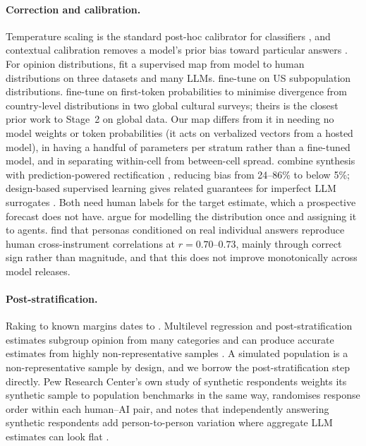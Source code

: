 \documentclass[11pt]{article}
\begin{document}
\paragraph{Correction and calibration.}
Temperature scaling is the standard post-hoc calibrator for classifiers \citep{guo2017calibration}, and contextual calibration removes a model's prior bias toward particular answers \citep{zhao2021calibrate}. For opinion distributions, \citet{kambhatla2025supervision} fit a supervised map from model to human distributions on three datasets and many LLMs. \citet{suh2025subpop} fine-tune on US subpopulation distributions. \citet{cao2025specializing} fine-tune on first-token probabilities to minimise divergence from country-level distributions in two global cultural surveys; theirs is the closest prior work to Stage~2 on global data. Our map differs from it in needing no model weights or token probabilities (it acts on verbalized vectors from a hosted model), in having a handful of parameters per stratum rather than a fine-tuned model, and in separating within-cell from between-cell spread. \citet{krsteski2025valid} combine synthesis with prediction-powered rectification \citep{angelopoulos2023ppi}, reducing bias from 24--86\% to below 5\%; design-based supervised learning gives related guarantees for imperfect LLM surrogates \citep{egami2023dsl}. Both need human labels for the target estimate, which a prospective forecast does not have. \citet{ozkan2026distribution} argue for modelling the distribution once and assigning it to agents. \citet{lee2026openweight} find that personas conditioned on real individual answers reproduce human cross-instrument correlations at $r=0.70$--$0.73$, mainly through correct sign rather than magnitude, and that this does not improve monotonically across model releases.

\paragraph{Post-stratification.}
Raking to known margins dates to \citet{deming1940ipf}. Multilevel regression and post-stratification estimates subgroup opinion from many categories \citep{gelman1997poststrat,park2004mrp} and can produce accurate estimates from highly non-representative samples \citep{wang2015xbox}. A simulated population is a non-representative sample by design, and we borrow the post-stratification step directly. Pew Research Center's own study of synthetic respondents weights its synthetic sample to population benchmarks in the same way, randomises response order within each human--AI pair, and notes that independently answering synthetic respondents add person-to-person variation where aggregate LLM estimates can look flat \citep{pew2026silicon}.
\end{document}

